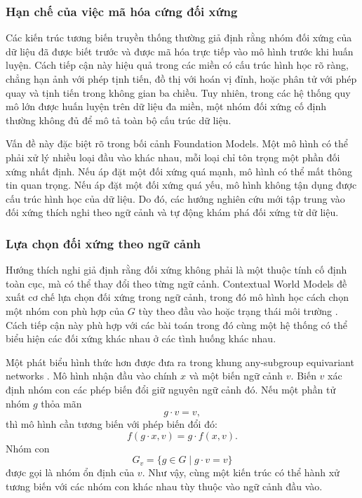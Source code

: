 \subsubsection{Hạn chế của việc mã hóa cứng đối xứng}

Các kiến trúc tương biến truyền thống thường giả định rằng nhóm đối xứng của dữ liệu đã được biết trước và được mã hóa trực tiếp vào mô hình trước khi huấn luyện. Cách tiếp cận này hiệu quả trong các miền có cấu trúc hình học rõ ràng, chẳng hạn ảnh với phép tịnh tiến, đồ thị với hoán vị đỉnh, hoặc phân tử với phép quay và tịnh tiến trong không gian ba chiều. Tuy nhiên, trong các hệ thống quy mô lớn được huấn luyện trên dữ liệu đa miền, một nhóm đối xứng cố định thường không đủ để mô tả toàn bộ cấu trúc dữ liệu.

Vấn đề này đặc biệt rõ trong bối cảnh Foundation Models. Một mô hình có thể phải xử lý nhiều loại đầu vào khác nhau, mỗi loại chỉ tôn trọng một phần đối xứng nhất định. Nếu áp đặt một đối xứng quá mạnh, mô hình có thể mất thông tin quan trọng. Nếu áp đặt một đối xứng quá yếu, mô hình không tận dụng được cấu trúc hình học của dữ liệu. Do đó, các hướng nghiên cứu mới tập trung vào đối xứng thích nghi theo ngữ cảnh và tự động khám phá đối xứng từ dữ liệu.

\subsubsection{Lựa chọn đối xứng theo ngữ cảnh}

Hướng thích nghi giả định rằng đối xứng không phải là một thuộc tính cố định toàn cục, mà có thể thay đổi theo từng ngữ cảnh. Contextual World Models đề xuất cơ chế lựa chọn đối xứng trong ngữ cảnh, trong đó mô hình học cách chọn một nhóm con phù hợp của $G$ tùy theo đầu vào hoặc trạng thái môi trường \cite{gupta2024contextual}. Cách tiếp cận này phù hợp với các bài toán trong đó cùng một hệ thống có thể biểu hiện các đối xứng khác nhau ở các tình huống khác nhau.

Một phát biểu hình thức hơn được đưa ra trong khung any-subgroup equivariant networks \cite{goel2025anysubgroup}. Mô hình nhận đầu vào chính $x$ và một biến ngữ cảnh $v$. Biến $v$ xác định nhóm con các phép biến đổi giữ nguyên ngữ cảnh đó. Nếu một phần tử nhóm $g$ thỏa mãn
\begin{equation}
    g \cdot v = v,
    \label{eq:context-stabilizer}
\end{equation}
thì mô hình cần tương biến với phép biến đổi đó:
\begin{equation}
    f(g \cdot x, v)
    =
    g \cdot f(x, v).
    \label{eq:any-subgroup-equivariance}
\end{equation}
Nhóm con
\begin{equation}
    G_v
    =
    \{g \in G \mid g \cdot v = v\}
    \label{eq:context-dependent-subgroup}
\end{equation}
được gọi là nhóm ổn định của $v$. Như vậy, cùng một kiến trúc có thể hành xử tương biến với các nhóm con khác nhau tùy thuộc vào ngữ cảnh đầu vào.

